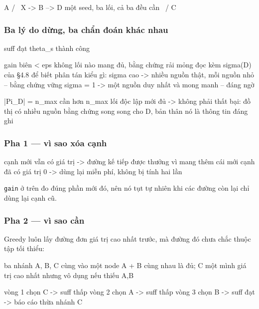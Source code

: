 \documentclass[11pt,a4paper]{article}
\begin{document}
\begin{dia}
        A
      /   \
X -> B --> D          một seed, ba lối, cả ba đều cần
      \   /
        C
\end{dia}

\subsubsection*{Ba lý do dừng, ba chẩn đoán khác nhau}

\begin{dia}
suff đạt theta_s     thành công

gain biên < eps      không lối nào mang đủ, bằng chứng rải mỏng
                     đọc kèm sigma(D) của §4.8 để biết phân tán kiểu gì:
                        sigma cao -> nhiều nguồn thật, mỗi nguồn nhỏ -- bằng chứng vững
                        sigma = 1 -> một nguồn duy nhất và mong manh -- đáng ngờ

|Pi_D| = n_max       cần hơn n_max lối độc lập mới đủ
                     -> không phải thất bại: đồ thị có nhiều nguồn bằng chứng song
                        song cho D, bản thân nó là thông tin đáng ghi
\end{dia}

\subsubsection*{Pha 1 --- vì sao xóa cạnh}

\begin{dia}
cạnh mới    vẫn có giá trị  ->  đường kế tiếp được thưởng vì mang thêm cái mới
cạnh đã có  giá trị 0       ->  dùng lại miễn phí, không bị tính hai lần
\end{dia}

\texttt{gain} ở trên đo đúng phần mới đó, nên nó tụt tự nhiên khi các đường còn lại chỉ
dùng lại cạnh cũ.

\subsubsection*{Pha 2 --- vì sao cần}

Greedy luôn lấy đường đơn giá trị cao nhất trước, mà đường đó chưa chắc thuộc tập tối thiểu:

\begin{dia}
ba nhánh A, B, C cùng vào một node
A + B cùng nhau là đủ; C một mình giá trị cao nhất nhưng vô dụng nếu thiếu A,B

vòng 1 chọn C  ->  suff thấp
vòng 2 chọn A  ->  suff thấp
vòng 3 chọn B  ->  suff đạt
-> báo cáo thừa nhánh C
\end{dia}
\end{document}
